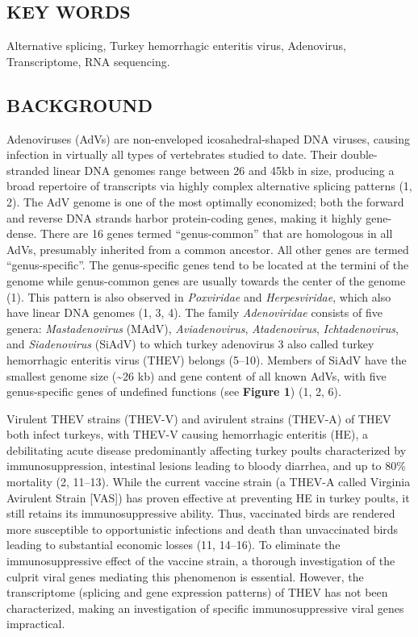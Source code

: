\documentclass[
]{article}
\begin{document}
\subsection{KEY WORDS}\label{key-words}

Alternative splicing, Turkey hemorrhagic enteritis virus, Adenovirus,
Transcriptome, RNA sequencing. \newpage

\subsection{BACKGROUND}\label{background}

Adenoviruses (AdVs) are non-enveloped icosahedral-shaped DNA viruses,
causing infection in virtually all types of vertebrates studied to date.
Their double-stranded linear DNA genomes range between 26 and 45kb in
size, producing a broad repertoire of transcripts via highly complex
alternative splicing patterns (1, 2). The AdV genome is one of the most
optimally economized; both the forward and reverse DNA strands harbor
protein-coding genes, making it highly gene-dense. There are 16 genes
termed ``genus-common'' that are homologous in all AdVs, presumably
inherited from a common ancestor. All other genes are termed
``genus-specific''. The genus-specific genes tend to be located at the
termini of the genome while genus-common genes are usually towards the
center of the genome (1). This pattern is also observed in
\emph{Poxviridae} and \emph{Herpesviridae}, which also have linear DNA
genomes (1, 3, 4). The family \emph{Adenoviridae} consists of five
genera: \emph{Mastadenovirus} (MAdV), \emph{Aviadenovirus},
\emph{Atadenovirus}, \emph{Ichtadenovirus}, and \emph{Siadenovirus}
(SiAdV) to which turkey adenovirus 3 also called turkey hemorrhagic
enteritis virus (THEV) belongs (5--10). Members of SiAdV have the
smallest genome size (\textasciitilde26 kb) and gene content of all
known AdVs, with five genus-specific genes of undefined functions (see
\textbf{Figure 1}) (1, 2, 6).

Virulent THEV strains (THEV-V) and avirulent strains (THEV-A) of THEV
both infect turkeys, with THEV-V causing hemorrhagic enteritis (HE), a
debilitating acute disease predominantly affecting turkey poults
characterized by immunosuppression, intestinal lesions leading to bloody
diarrhea, and up to 80\% mortality (2, 11--13). While the current
vaccine strain (a THEV-A called Virginia Avirulent Strain {[}VAS{]}) has
proven effective at preventing HE in turkey poults, it still retains its
immunosuppressive ability. Thus, vaccinated birds are rendered more
susceptible to opportunistic infections and death than unvaccinated
birds leading to substantial economic losses (11, 14--16). To eliminate
the immunosuppressive effect of the vaccine strain, a thorough
investigation of the culprit viral genes mediating this phenomenon is
essential. However, the transcriptome (splicing and gene expression
patterns) of THEV has not been characterized, making an investigation of
specific immunosuppressive viral genes impractical.
\end{document}
